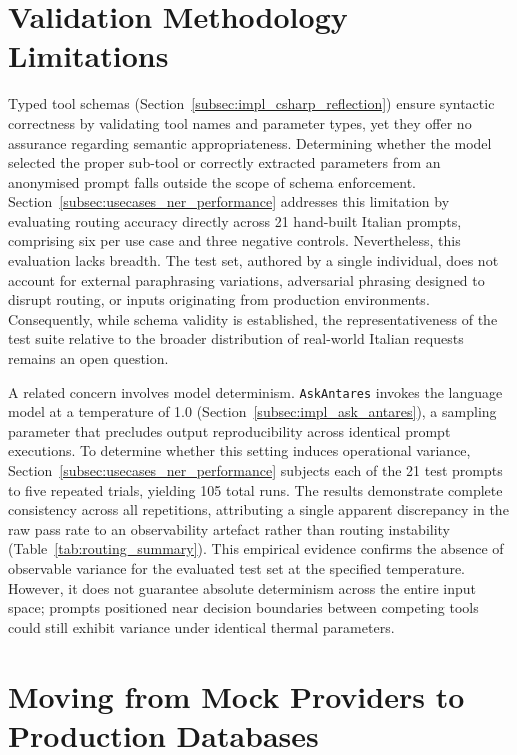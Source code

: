 \section{Validation Methodology Limitations}
\label{sec:discussion_validation_limitations}

Typed tool schemas (Section~\ref{subsec:impl_csharp_reflection}) ensure syntactic correctness by validating tool names and parameter types, yet they offer no assurance regarding semantic appropriateness. Determining whether the model selected the proper sub-tool or correctly extracted parameters from an anonymised prompt falls outside the scope of schema enforcement. Section~\ref{subsec:usecases_ner_performance} addresses this limitation by evaluating routing accuracy directly across 21 hand-built Italian prompts, comprising six per use case and three negative controls. Nevertheless, this evaluation lacks breadth. The test set, authored by a single individual, does not account for external paraphrasing variations, adversarial phrasing designed to disrupt routing, or inputs originating from production environments. Consequently, while schema validity is established, the representativeness of the test suite relative to the broader distribution of real-world Italian requests remains an open question.

A related concern involves model determinism. \texttt{AskAntares} invokes the language model at a temperature of 1.0 (Section~\ref{subsec:impl_ask_antares}), a sampling parameter that precludes output reproducibility across identical prompt executions. To determine whether this setting induces operational variance, Section~\ref{subsec:usecases_ner_performance} subjects each of the 21 test prompts to five repeated trials, yielding 105 total runs. The results demonstrate complete consistency across all repetitions, attributing a single apparent discrepancy in the raw pass rate to an observability artefact rather than routing instability (Table~\ref{tab:routing_summary}). This empirical evidence confirms the absence of observable variance for the evaluated test set at the specified temperature. However, it does not guarantee absolute determinism across the entire input space; prompts positioned near decision boundaries between competing tools could still exhibit variance under identical thermal parameters.

\section{Moving from Mock Providers to Production Databases}
\label{sec:discussion_production_migration}

